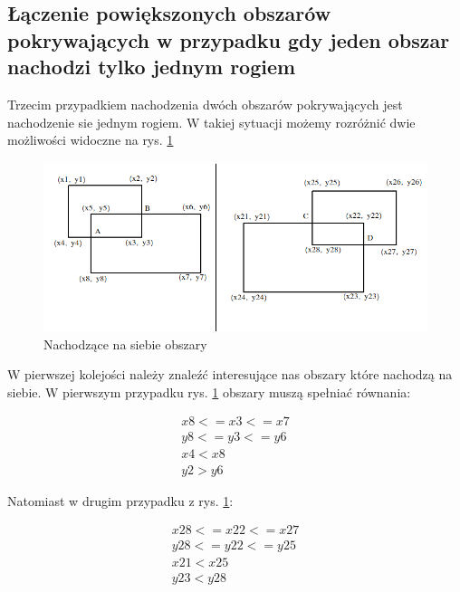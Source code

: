 \newpage
\subsection{Łączenie powiększonych obszarów pokrywających w przypadku gdy jeden obszar nachodzi tylko jednym rogiem }

Trzecim przypadkiem nachodzenia dwóch obszarów pokrywających jest nachodzenie sie jednym rogiem. W takiej sytuacji możemy rozróżnić dwie możliwości widoczne na rys. \ref{fig:mergedKrawedzie} 

\begin{figure}[h]
\caption{Nachodzące na siebie obszary}
\label{fig:mergedKrawedzie}
\centering
\includegraphics[width=1\textwidth]{mergedKrawedzie}
\end{figure}

W pierwszej kolejości należy znaleźć interesujące nas obszary które nachodzą na siebie. W pierwszym przypadku rys. \ref{fig:mergedKrawedzie} obszary muszą spełniać równania:

\begin{equation}
\begin{split}
x8 <= x3 <= x7 \\
y8 <= y3 <= y6 \\
x4 < x8 \\
y2 > y6
\end{split}
\end{equation}

Natomiast w drugim przypadku z rys. \ref{fig:mergedKrawedzie}:

\begin{equation}
\begin{split}
x28 <= x22 <= x27 \\
y28 <= y22 <= y25 \\
x21 < x25 \\
y23 < y28
\end{split}
\end{equation}

